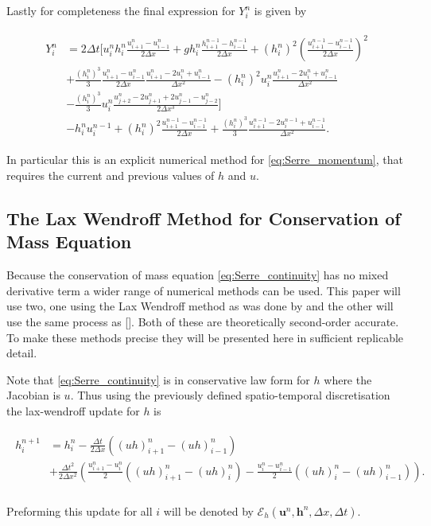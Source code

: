 \documentclass[SingleSpace,12pt,Proceedings]{Serre_ASCE}
\begin{document}
Lastly for completeness the final expression for $Y^n_i$ is given by
\begin{linenomath*}
\begin{gather}
\begin{split}
Y^n_i &= 2\Delta t \Bigg[u^n_ih^n_i \frac{u^{n}_{i+1} - u^{n}_{i-1}}{2\Delta x} + gh^n_i\frac{h^{n-1}_{i+1} - h^{n-1}_{i-1}}{2\Delta x} + \left(h^n_i\right)^2 \left(\frac{u^{n-1}_{i+1} - u^{n-1}_{i-1}}{2\Delta x} \right)^2 \\ &+ \frac{\left(h^n_i\right)^3}{3}\frac{u^{n}_{i+1} - u^{n}_{i-1}}{2\Delta x}\frac{u^{n}_{i+1} -2u^{n}_{i}   + u^{n}_{i-1}}{\Delta x^2} - \left(h^n_i\right)^2u^n_i\frac{u^{n}_{i+1} -2u^{n}_{i} + u^{n}_{i-1}}{\Delta x^2}  \\  &- \frac{\left(h^n_i\right)^3}{3}u^n_i\frac{ u^n_{j+2} - 2u^n_{j+1} + 2 u^n_{j-1} - u^n_{j-2}}{2 \Delta x^3} \Bigg] \\ &- h_i^{n}u_i^{n-1} + \left(h_i^{n}\right)^2\frac{u^{n-1}_{i+1} - u^{n-1}_{i-1}}{2\Delta x} + \frac{\left(h_i^{n}\right)^3}{3}\frac{u^{n-1}_{i+1} -2 u^{n-1}_{i} + u^{n-1}_{i-1}}{\Delta x^2}.
\end{split}
\end{gather}
\end{linenomath*}
In particular this is an explicit numerical method for \eqref{eq:Serre_momentum}, that requires the current and previous values of $h$ and $u$.


\subsection{The Lax Wendroff Method for Conservation of Mass Equation}
\label{section:}
Because the conservation of mass equation \eqref{eq:Serre_continuity} has no mixed derivative term a wider range of numerical methods can be used. This paper will use two, one using the Lax Wendroff method as was done by  and the other will use the same process as []. Both of these are theoretically second-order accurate. To make these methods precise they will be presented here in sufficient replicable detail.

Note that \eqref{eq:Serre_continuity} is in conservative law form for $h$ where the Jacobian is $u$. Thus using the previously defined spatio-temporal discretisation the lax-wendroff update for $h$ is
\begin{linenomath*}
\begin{gather}
\begin{split}
h^{n+1}_i &= h^{n}_i - \frac{\Delta t}{2\Delta x} \left(\left(uh\right)^n_{i+1} - \left(uh\right)^n_{i-1}\right) \\ &+ \frac{\Delta t^2}{2\Delta x^2}\left(\frac{u^n_{i+1} - u^n_{i} }{2}\left(\left(uh\right)^n_{i+1} - \left(uh\right)^n_{i}\right) - \frac{u^n_{i} - u^n_{i-1} }{2}\left(\left(uh\right)^n_{i} - \left(uh\right)^n_{i-1}\right) \right). \\
\end{split}
\label{eq:LW4h}
\end{gather}
\end{linenomath*}
Preforming this update for all $i$ will be denoted by $\mathcal{E}_h\left(\boldsymbol{u}^n,\boldsymbol{h}^n ,\Delta x, \Delta t \right)$.
\end{document}
